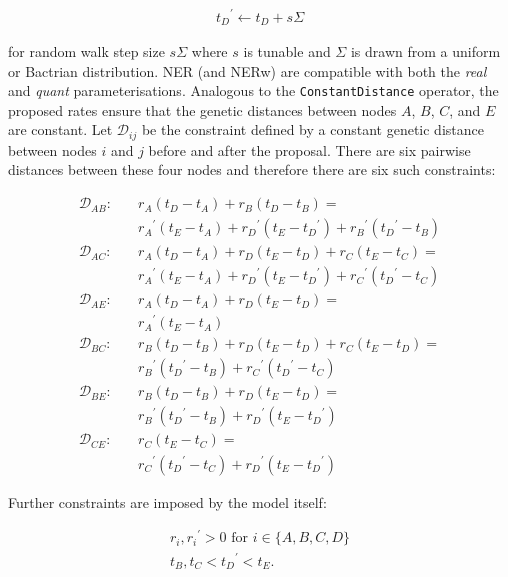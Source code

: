 \documentclass[10pt,letterpaper]{article}
\begin{document}
\begin{align}
	{t_D}^\prime \leftarrow t_D + s\Sigma
\end{align}

\noindent
for random walk step size $s\Sigma$ where $s$ is tunable and $\Sigma$ is drawn from a uniform or Bactrian distribution. NER (and NERw) are compatible with both the \textit{real} and \textit{quant} parameterisations. 
Analogous to the \texttt{ConstantDistance} operator, the proposed rates ensure that the genetic distances between nodes $A$, $B$, $C$, and $E$ are constant. 
Let $\mathcal{D}_{ij}$ be the constraint defined by a constant genetic distance between nodes $i$ and $j$ before and after the proposal.
There are six pairwise distances between these four nodes and therefore there are six such constraints:


\begin{align}
	\mathcal{D}_{AB}: \quad & r_A  (t_D - t_A) + r_B  (t_D - t_B) = \nonumber \\
					 & {r_A}^\prime  (t_E - t_A) + {r_D}^\prime  (t_E - {t_D}^\prime) + {r_B}^\prime ({t_D}^\prime - t_B) \\
	\mathcal{D}_{AC}: \quad & r_A  (t_D - t_A) + r_D  (t_E - t_D) + r_C  (t_E - t_C) = \nonumber \\
				 	  & {r_A}^\prime  (t_E - t_A) + {r_D}^\prime  (t_E - {t_D}^\prime) + {r_C}^\prime ({t_D}^\prime - t_C) \\
 	\mathcal{D}_{AE}: \quad & r_A  (t_D - t_A) + r_D  (t_E - t_D)= \nonumber \\
					  & {r_A}^\prime  (t_E - t_A) \\
  	\mathcal{D}_{BC}: \quad & r_B  (t_D - t_B) + r_D  (t_E - t_D) + r_C  (t_E - t_D)= \nonumber \\
					  & {r_B}^\prime ({t_D}^\prime - t_B) + {r_C}^\prime ({t_D}^\prime - t_C) \\
   	\mathcal{D}_{BE}: \quad & r_B  (t_D - t_B) + r_D  (t_E - t_D)= \nonumber \\
					  & {r_B}^\prime ({t_D}^\prime - t_B) + {r_D}^\prime (t_E - {t_D}^\prime) \\
	\mathcal{D}_{CE}: \quad & r_C  (t_E - t_C)= \nonumber \\
					  & {r_C}^\prime ({t_D}^\prime - t_C) + {r_D}^\prime (t_E - {t_D}^\prime) 
\end{align}


Further constraints are imposed by the model itself:


\begin{align}
	r_i, {r_i}^\prime > 0 \text { for } i \in \{A,B,C,D\} \\
	t_B, t_C  < {t_D}^\prime < t_E.
\end{align}
\end{document}
